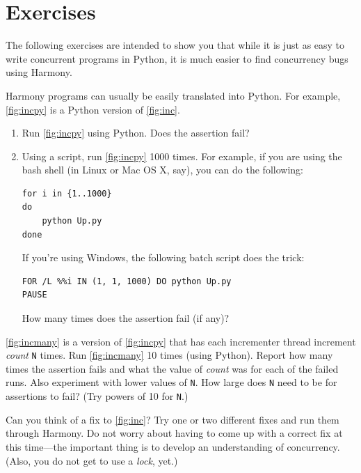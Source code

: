 \documentclass{report}
\newenvironment{code}{
\tcolorbox
}{
\endtcolorbox
}
\begin{document}
\section*{Exercises}

The following exercises are intended to show you that while it is just
as easy to write concurrent programs in Python, it is much easier to
find concurrency bugs using Harmony.

\begin{problems}
\item Harmony programs can usually be easily translated into Python.  For example,
\autoref{fig:incpy} is a Python version of \autoref{fig:inc}.
\begin{enumerate}
\item Run \autoref{fig:incpy} using Python.  Does the assertion fail?
\item Using a script, run \autoref{fig:incpy} 1000 times.
For example, if you are using the bash shell (in Linux or Mac OS X, say), you can do the following:
\begin{code}
\begin{verbatim}
for i in {1..1000}
do
    python Up.py
done
\end{verbatim}
\end{code}
If you're using Windows, the following batch script does the trick:
\begin{code}
\begin{verbatim}
FOR /L %%i IN (1, 1, 1000) DO python Up.py
PAUSE
\end{verbatim}
\end{code}
How many times does the assertion fail (if any)?
\end{enumerate}
\item \autoref{fig:incmany} is a version of \autoref{fig:incpy} that has each
incrementer thread increment \textit{count} \texttt{N} times.  Run \autoref{fig:incmany}
10 times (using Python).
Report how many times the assertion fails and what the value of \textit{count}
was for each of the failed runs.
Also experiment with lower values of \texttt{N}.
How large does \texttt{N} need to be for assertions to fail?
(Try powers of 10 for \texttt{N}.)
\item Can you think of a fix to \autoref{fig:inc}?  Try one or two different fixes
and run them through Harmony.  Do not worry about having to come up with a correct fix at this
time---the important thing is to develop an understanding of concurrency.
(Also, you do not get to use a \emph{lock}, yet.)
\end{problems}
\end{document}
